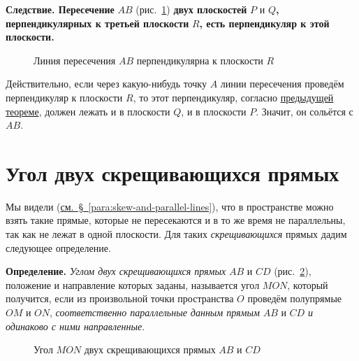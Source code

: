  \textbf{Следствие. Пересечение} \(AB\) (рис.~\ref{fig:kiselev-stereo-339}) \textbf{двух плоскостей} \(P\) и \(Q\)\textbf{, перпендикулярных к третьей плоскости} \(R\)\textbf{, есть перпендикуляр к этой плоскости.}

\begin{figure}[htbp]
    \centering
    \renewcommand{\thefigure}{339}
    \captionsetup{name=Рис.,labelsep=period}
    
    \caption{Линия пересечения \(AB\) перпендикулярна к плоскости \(R\)}\label{fig:kiselev-stereo-339}
\end{figure}

Действительно, если через какую-нибудь точку \(A\) линии пересечения проведём перпендикуляр к плоскости \(R\), то этот перпендикуляр, согласно \hyperref[para:normal-in-perpendicular-plane]{предыдущей теореме}, должен лежать и в плоскости \(Q\), и в плоскости \(P\). Значит, он сольётся с \(AB\).

\section*{Угол двух скрещивающихся прямых}

 Мы видели (\hyperref[para:skew-and-parallel-lines]{см.~§~\ref*{para:skew-and-parallel-lines}}), что в пространстве можно взять такие прямые, которые не пересекаются и в то же время не параллельны, так как не лежат в одной плоскости. Для таких \emph{скрещивающихся} прямых дадим следующее определение.

\textbf{Определение.} \emph{Углом двух скрещивающихся прямых} \(AB\) и \(CD\) (рис.~\ref{fig:kiselev-stereo-340}), положение и направление которых заданы, называется угол \(MON\), который получится, если из произвольной точки пространства \(O\) проведём полупрямые \(OM\) и \(ON\), \emph{соответственно параллельные данным прямым} \(AB\) и \(CD\) \emph{и одинаково с ними направленные}.

\begin{figure}[htbp]
    \centering
    \renewcommand{\thefigure}{340}
    \captionsetup{name=Рис.,labelsep=period}
    
    \caption{Угол \(MON\) двух скрещивающихся прямых \(AB\) и \(CD\)}\label{fig:kiselev-stereo-340}
\end{figure}

